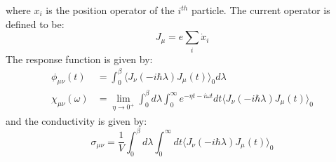 \documentclass{article}
\begin{document}
where $x_i$ is the position operator of the $i^{th}$ particle. The current operator is 
defined to be:
\begin{equation}
    J_{\mu} = e \sum_i \dot{x}_i
\end{equation}
The response function is given by:
\begin{align}
    \phi_{\mu\nu} (t) &= \int_0^{\beta} \langle J_{\nu}(-i\hbar\lambda) J_{\mu}(t) \rangle_0 d\lambda \\
    \chi_{\mu\nu}(\omega)&= 
    \lim_{\eta\to 0^+} \int_0^{\beta} d\lambda \int_{0}^{\infty} e^{-\eta t-i\omega t} dt  \langle J_{\nu}(-i\hbar\lambda) J_{\mu}(t) \rangle_0
\end{align}
and the conductivity is given by:
\begin{equation}
    \sigma_{\mu\nu} = \frac{1}{V} \int_0^{\beta} d\lambda \int_{0}^{\infty} dt \langle J_{\nu}(-i\hbar\lambda) J_{\mu}(t) \rangle_0
\end{equation}
\end{document}
